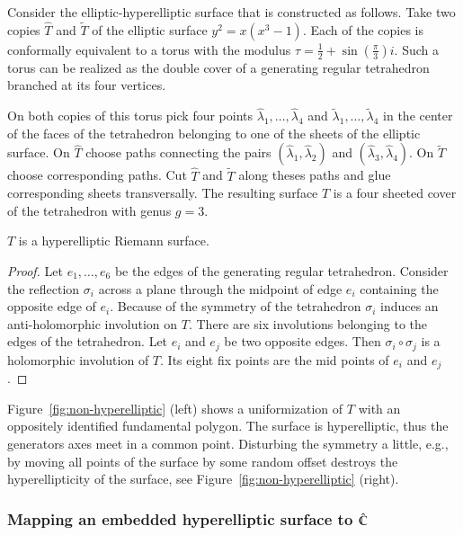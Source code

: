 \documentclass[Thesis]{subfiles}
\begin{document}
Consider the elliptic-hyperelliptic surface that is constructed as follows. Take two copies $\hat T$ and $\tilde T$ of the elliptic surface $y^2=x(x^3 - 1)$. Each of the copies is conformally equivalent to a torus with the modulus $\tau=\frac{1}{2}+\sin(\frac{\pi}{3})i$. Such a torus can be realized as the double cover of a generating regular tetrahedron branched at its four vertices.

On both copies of this torus pick four points $\hat\lambda_1,\ldots,\hat\lambda_4$ and $\tilde\lambda_1,\ldots,\tilde\lambda_4$ in the center of the faces of the tetrahedron belonging to one of the sheets of the elliptic surface. On $\hat T$ choose paths connecting the pairs $(\hat\lambda_1,\hat\lambda_2)$ and $(\hat\lambda_3,\hat\lambda_4)$. On $\tilde T$ choose corresponding paths. Cut $\hat T$ and $\tilde T$ along theses paths and glue corresponding sheets transversally. The resulting surface $T$ is a four sheeted cover of the tetrahedron with genus $g = 3$.

\begin{theorem}
$T$ is a hyperelliptic Riemann surface.
\begin{proof}
Let $e_1,\ldots,e_6$ be the edges of the generating regular tetrahedron. Consider the reflection $\sigma_i$ across a plane through the midpoint of edge $e_i$ containing the opposite edge of $e_i$.  Because of the symmetry of the tetrahedron $\sigma_i$ induces an anti-holomorphic involution on $T$. There are six involutions belonging to the edges of the tetrahedron. Let $e_i$ and $e_j$ be two opposite edges. Then $\sigma_i \circ \sigma_j$ is a holomorphic involution of $T$. Its eight fix points are the mid points of $e_i$ and $e_j$.
\end{proof}
\end{theorem}

Figure~\ref{fig:non-hyperelliptic} (left) shows a uniformization of $T$ with an oppositely identified fundamental polygon. The surface is hyperelliptic, thus the generators axes meet in a common point. Disturbing the symmetry a little, e.g., by moving all points of the surface by some random offset destroys the hyperellipticity of the surface, see Figure~\ref{fig:non-hyperelliptic} (right).

\subsubsection{Mapping an embedded hyperelliptic surface to $\hat{\mathbb C}$}
\end{document}

